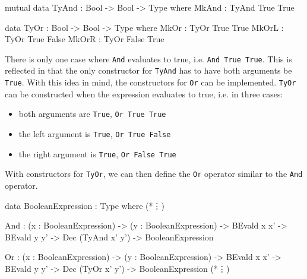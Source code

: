     \begin{code}[label={des:tyand-or}, caption={The constructors for true \texttt{And} and \texttt{Or} statements}, escapeinside={(*}{*)}]
        mutual
            data TyAnd : Bool -> Bool -> Type where
                MkAnd  : TyAnd True True
            
            data TyOr : Bool -> Bool -> Type where
                MkOr  : TyOr True True
                MkOrL : TyOr True False
                MkOrR : TyOr False True
    \end{code}

    There is only one case where \texttt{And} evaluates to true, i.e. \texttt{And True True}. This is reflected in that the only constructor for \texttt{TyAnd} has to have both arguments be \texttt{True}. With this idea in mind, the constructors for \texttt{Or} can be implemented. \texttt{TyOr} can be constructed when the expression evaluates to true, i.e. in three cases:
    \begin{itemize}
        \item both arguments are \texttt{True}, \texttt{Or True True}
        \item the left argument is \texttt{True}, \texttt{Or True False}
        \item the right argument is \texttt{True}, \texttt{Or False True}
    \end{itemize}
    
    With constructors for \texttt{TyOr}, we can then define the \texttt{Or} operator similar to the \texttt{And} operator.
    
    \newpage
    
    \begin{code}[caption={The definitions of \texttt{And} and \texttt{Or}}, escapeinside={(*}{*)}]
            data BooleanExpression : Type where
                (*\vdots*)
                
                And :  (x : BooleanExpression)
                    -> (y : BooleanExpression)
                    -> BEvald x x'
                    -> BEvald y y'
                    -> Dec (TyAnd x' y')
                    -> BooleanExpression
                
                Or  :  (x : BooleanExpression)
                    -> (y : BooleanExpression)
                    -> BEvald x x'
                    -> BEvald y y'
                    -> Dec (TyOr x' y')
                    -> BooleanExpression
                (*\vdots*)
    \end{code}

